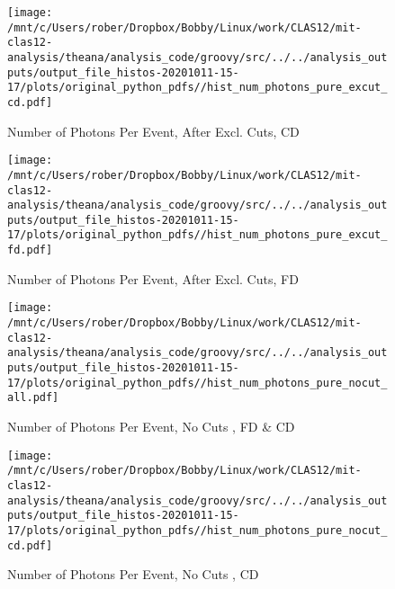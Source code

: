 \documentclass{article}
\begin{document}
\begin{landscape}
    \begin{figure}[h]
        \centering

        \texttt{[image: /mnt/c/Users/rober/Dropbox/Bobby/Linux/work/CLAS12/mit-clas12-analysis/theana/analysis\_code/groovy/src/../../analysis\_outputs/output\_file\_histos-20201011-15-17/plots/original\_python\_pdfs//hist\_num\_photons\_pure\_excut\_cd.pdf]}
        \captionsetup{textformat=empty,labelformat=blank}
        \caption{Number of Photons Per Event, After Excl. Cuts, CD}
    \end{figure}
    \clearpage
    
    \begin{figure}[h]
        \centering

        \texttt{[image: /mnt/c/Users/rober/Dropbox/Bobby/Linux/work/CLAS12/mit-clas12-analysis/theana/analysis\_code/groovy/src/../../analysis\_outputs/output\_file\_histos-20201011-15-17/plots/original\_python\_pdfs//hist\_num\_photons\_pure\_excut\_fd.pdf]}
        \captionsetup{textformat=empty,labelformat=blank}
        \caption{Number of Photons Per Event, After Excl. Cuts, FD}
    \end{figure}
    \clearpage
    
    \begin{figure}[h]
        \centering

        \texttt{[image: /mnt/c/Users/rober/Dropbox/Bobby/Linux/work/CLAS12/mit-clas12-analysis/theana/analysis\_code/groovy/src/../../analysis\_outputs/output\_file\_histos-20201011-15-17/plots/original\_python\_pdfs//hist\_num\_photons\_pure\_nocut\_all.pdf]}
        \captionsetup{textformat=empty,labelformat=blank}
        \caption{Number of Photons Per Event, No Cuts , FD \& CD}
    \end{figure}
    \clearpage
    
    \begin{figure}[h]
        \centering

        \texttt{[image: /mnt/c/Users/rober/Dropbox/Bobby/Linux/work/CLAS12/mit-clas12-analysis/theana/analysis\_code/groovy/src/../../analysis\_outputs/output\_file\_histos-20201011-15-17/plots/original\_python\_pdfs//hist\_num\_photons\_pure\_nocut\_cd.pdf]}
        \captionsetup{textformat=empty,labelformat=blank}
        \caption{Number of Photons Per Event, No Cuts , CD}
    \end{figure}
    \clearpage
    
    \begin{figure}[h]
        \centering


\end{figure}
\end{landscape}
\end{document}
